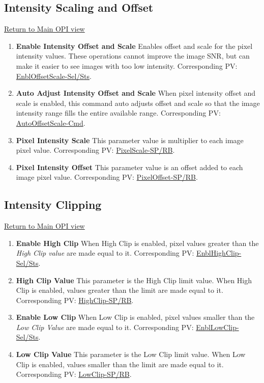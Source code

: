 \documentclass[openany]{article}
\begin{document}
    \subsection{Intensity Scaling and Offset}\label{sec:scaling}

        \hyperref[fig:opi-main]{Return to Main OPI view}

        \begin{enumerate}
            \item \textbf{Enable Intensity Offset and Scale} Enables offset and scale for the pixel intensity values. These operations cannot improve the image SNR, but can make it easier to see images with too low intensity. Corresponding PV: \hyperlink{pv:enbl-offset-scale}{EnblOffsetScale-Sel/Sts}.
            \item \textbf{Auto Adjust Intensity Offset and Scale} When pixel intensity offset and scale is enabled, this command auto adjusts offset and scale so that the image intensity range fills the entire available range. Corresponding PV: \hyperlink{pv:auto-offset-scale}{AutoOffsetScale-Cmd}.
            \item \textbf{Pixel Intensity Scale} This parameter value is multiplier to each image pixel value. Corresponding PV: \hyperlink{pv:pixel-scale}{PixelScale-SP/RB}.
            \item \textbf{Pixel Intensity Offset} This parameter value is an offset added to each image pixel value. Corresponding PV: \hyperlink{pv:pixel-offset}{PixelOffset-SP/RB}.
        \end{enumerate}

    \subsection{Intensity Clipping}\label{sec:clipping}

        \hyperref[fig:opi-main]{Return to Main OPI view}

        \begin{enumerate}
            \item \textbf{Enable High Clip} When High Clip is enabled, pixel values greater than the \emph{High Clip value} are made equal to it. Corresponding PV: \hyperlink{pv:enbl-high-clip}{EnblHighClip-Sel/Sts}.
            \item \textbf{High Clip Value} This parameter is the High Clip limit value. When High Clip is enabled, values greater than the limit are made equal to it. Corresponding PV: \hyperlink{pv:high-clip}{HighClip-SP/RB}.
            \item \textbf{Enable Low Clip}  When Low Clip is enabled, pixel values smaller than the \emph{Low Clip Value} are made equal to it. Corresponding PV: \hyperlink{pv:enbl-low-clip}{EnblLowClip-Sel/Sts}.
            \item \textbf{Low Clip Value} This parameter is the Low Clip limit value. When Low Clip is enabled, values smaller than the limit are made equal to it. Corresponding PV: \hyperlink{pv:low-clip}{LowClip-SP/RB}.
        \end{enumerate}
\end{document}
